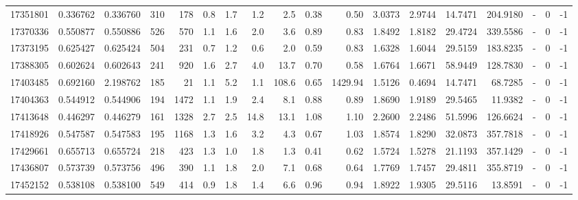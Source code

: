 \begin{tabular}{rrrrrrrrrrrrrrrlrr}
  17351801 & 0.336762 &   0.336760 &  310 &  178 &      0.8 &      1.7 &     1.2 &      2.5 &       0.38 &        0.50 &  3.0373 &  2.9744 &   14.7471 &  204.9180 &             - &        0 &         -1 \\
  17370336 & 0.550877 &   0.550886 &  526 &  570 &      1.1 &      1.6 &     2.0 &      3.6 &       0.89 &        0.83 &  1.8492 &  1.8182 &   29.4724 &  339.5586 &             - &        0 &         -1 \\
  17373195 & 0.625427 &   0.625424 &  504 &  231 &      0.7 &      1.2 &     0.6 &      2.0 &       0.59 &        0.83 &  1.6328 &  1.6044 &   29.5159 &  183.8235 &             - &        0 &         -1 \\
  17388305 & 0.602624 &   0.602643 &  241 &  920 &      1.6 &      2.7 &     4.0 &     13.7 &       0.70 &        0.58 &  1.6764 &  1.6671 &   58.9449 &  128.7830 &             - &        0 &         -1 \\
  17403485 & 0.692160 &   2.198762 &  185 &   21 &      1.1 &      5.2 &     1.1 &    108.6 &       0.65 &     1429.94 &  1.5126 &  0.4694 &   14.7471 &   68.7285 &             - &        0 &         -1 \\
  17404363 & 0.544912 &   0.544906 &  194 & 1472 &      1.1 &      1.9 &     2.4 &      8.1 &       0.88 &        0.89 &  1.8690 &  1.9189 &   29.5465 &   11.9382 &             - &        0 &         -1 \\
  17413648 & 0.446297 &   0.446279 &  161 & 1328 &      2.7 &      2.5 &    14.8 &     13.1 &       1.08 &        1.10 &  2.2600 &  2.2486 &   51.5996 &  126.6624 &             - &        0 &         -1 \\
  17418926 & 0.547587 &   0.547583 &  195 & 1168 &      1.3 &      1.6 &     3.2 &      4.3 &       0.67 &        1.03 &  1.8574 &  1.8290 &   32.0873 &  357.7818 &             - &        0 &         -1 \\
  17429661 & 0.655713 &   0.655724 &  218 &  423 &      1.3 &      1.0 &     1.8 &      1.3 &       0.41 &        0.62 &  1.5724 &  1.5278 &   21.1193 &  357.1429 &             - &        0 &         -1 \\
  17436807 & 0.573739 &   0.573756 &  496 &  390 &      1.1 &      1.8 &     2.0 &      7.1 &       0.68 &        0.64 &  1.7769 &  1.7457 &   29.4811 &  355.8719 &             - &        0 &         -1 \\
  17452152 & 0.538108 &   0.538100 &  549 &  414 &      0.9 &      1.8 &     1.4 &      6.6 &       0.96 &        0.94 &  1.8922 &  1.9305 &   29.5116 &   13.8591 &             - &        0 &         -1 \\

\end{tabular}
